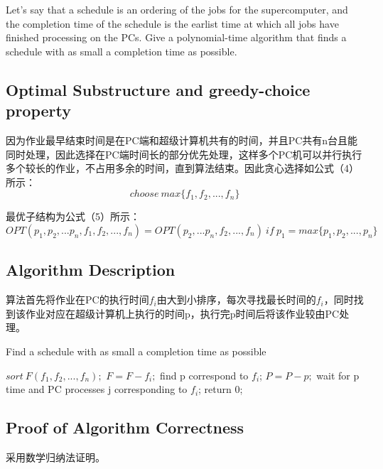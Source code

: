 \documentclass{article}
\begin{document}
\begin{CJK*}{UTF8}{gbsn}
Let's say that a schedule is an ordering of the jobs for the supercomputer, and the completion time of the schedule is the earlist time at which all jobs have finished processing on the PCs. Give a polynomial-time algorithm that finds a schedule with as small a completion time as possible.


\subsection{Optimal Substructure and greedy-choice property}
因为作业最早结束时间是在PC端和超级计算机共有的时间，并且PC共有n台且能同时处理，因此选择在PC端时间长的部分优先处理，这样多个PC机可以并行执行多个较长的作业，不占用多余的时间，直到算法结束。因此贪心选择如公式（4）所示：
\begin{equation}
choose\ max\{f_1,f_2,...,f_n\}
\end{equation}

最优子结构为公式（5）所示：
\begin{equation}
OPT(p_1,p_2,...p_n,f_1,f_2,...,f_n) = OPT(p_2,...p_n,f_2,...,f_n)\ if\ p_1 = max\{p_1,p_2,...,p_n\}
\end{equation} 

\subsection{Algorithm Description}
算法首先将作业在PC的执行时间$f_i$由大到小排序，每次寻找最长时间的$f_i$，同时找到该作业对应在超级计算机上执行的时间p，执行完p时间后将该作业较由PC处理。


\begin{algorithm}[htbp]  
  \caption{Find a schedule with as small a completion time as possible}  
  \begin{algorithmic}[1] 
	\State $sort\ F(f_1,f_2,...,f_n);$
	\State $F = F - f_i;$
	\State find p correspond to $f_i$;
	\State $P = P - p;$
	\State wait for p time and PC processes j corresponding to $f_i$;
	\EndFor
	\State return 0;
    \EndFunction 
  \end{algorithmic}  
\end{algorithm} 


\subsection{Proof of Algorithm Correctness}
采用数学归纳法证明。\\


\end{CJK*}
\end{document}
